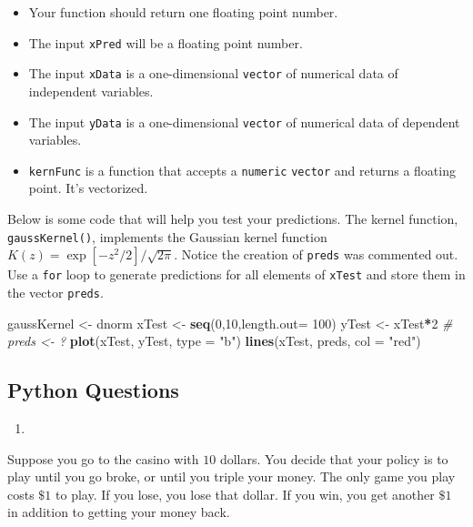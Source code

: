 \documentclass[12pt,krantz2]{krantz}
\makeatletter
\newenvironment{Shaded}{\begin{snugshade}}{\end{snugshade}}
\newcommand{\CommentTok}[1]{\textcolor[rgb]{0.37,0.37,0.37}{\textit{#1}}}
\newcommand{\DataTypeTok}[1]{\textcolor[rgb]{0.27,0.27,0.27}{#1}}
\newcommand{\DecValTok}[1]{\textcolor[rgb]{0.06,0.06,0.06}{#1}}
\newcommand{\KeywordTok}[1]{\textcolor[rgb]{0.27,0.27,0.27}{\textbf{#1}}}
\newcommand{\NormalTok}[1]{#1}
\newcommand{\OperatorTok}[1]{\textcolor[rgb]{0.43,0.43,0.43}{\textbf{#1}}}
\newcommand{\StringTok}[1]{\textcolor[rgb]{0.5,0.5,0.5}{#1}}
\providecommand{\tightlist}{%
  \setlength{\itemsep}{0pt}\setlength{\parskip}{0pt}}
\newenvironment{kframe}{%
\medskip{}
\setlength{\fboxsep}{.8em}
 \def\at@end@of@kframe{}%
 \ifinner\ifhmode%
  \def\at@end@of@kframe{\end{minipage}}%
  \begin{minipage}{\columnwidth}%
 \fi\fi%
 \def\FrameCommand##1{\hskip\@totalleftmargin \hskip-\fboxsep
 \colorbox{shadecolor}{##1}\hskip-\fboxsep
     \hskip-\linewidth \hskip-\@totalleftmargin \hskip\columnwidth}%
 \MakeFramed {\advance\hsize-\width
   \@totalleftmargin\z@ \linewidth\hsize
   \@setminipage}}%
 {\par\unskip\endMakeFramed%
 \at@end@of@kframe}
\renewenvironment{Shaded}{\begin{kframe}}{\end{kframe}}
\makeatother
\begin{document}
\begin{itemize}
\tightlist
\item
  Your function should return one floating point number.
\item
  The input \texttt{xPred} will be a floating point number.
\item
  The input \texttt{xData} is a one-dimensional \texttt{vector} of numerical data of independent variables.
\item
  The input \texttt{yData} is a one-dimensional \texttt{vector} of numerical data of dependent variables.
\item
  \texttt{kernFunc} is a function that accepts a \texttt{numeric} \texttt{vector} and returns a floating point. It's vectorized.
\end{itemize}

Below is some code that will help you test your predictions. The kernel function, \texttt{gaussKernel()}, implements the Gaussian kernel function \(K(z) = \exp[-z^2/2]/\sqrt{2\pi}\). Notice the creation of \texttt{preds} was commented out. Use a \texttt{for} loop to generate predictions for all elements of \texttt{xTest} and store them in the vector \texttt{preds}.

\begin{Shaded}
\begin{Highlighting}[]
\NormalTok{gaussKernel <-}\StringTok{ }\NormalTok{dnorm}
\NormalTok{xTest <-}\StringTok{ }\KeywordTok{seq}\NormalTok{(}\DecValTok{0}\NormalTok{,}\DecValTok{10}\NormalTok{,}\DataTypeTok{length.out=} \DecValTok{100}\NormalTok{)}
\NormalTok{yTest <-}\StringTok{ }\NormalTok{xTest}\OperatorTok{*}\DecValTok{2} 
\CommentTok{# preds <- ?}
\KeywordTok{plot}\NormalTok{(xTest, yTest, }\DataTypeTok{type =} \StringTok{"b"}\NormalTok{)}
\KeywordTok{lines}\NormalTok{(xTest, preds, }\DataTypeTok{col =} \StringTok{"red"}\NormalTok{)}
\end{Highlighting}
\end{Shaded}

\hypertarget{python-questions-8}{%
\subsection{Python Questions}\label{python-questions-8}}

\begin{enumerate}
\def\labelenumi{\arabic{enumi}.}
\item
\end{enumerate}

Suppose you go to the casino with \(10\) dollars. You decide that your policy is to play until you go broke, or until you triple your money. The only game you play costs \(\$1\) to play. If you lose, you lose that dollar. If you win, you get another \(\$1\) in addition to getting your money back.
\end{document}
